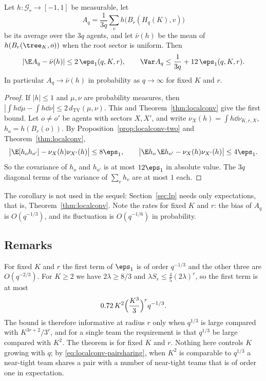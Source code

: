 \begin{corollary}\label{cor:localconv-prob}
Let $h\colon\mathcal G_r\to[-1,1]$ be measurable, let
\[
A_q=\frac1{3q}\sum_vh\bigl(B_r(H_q(K),v)\bigr)
\]
be its average over the $3q$ agents, and let $\bar\nu(h)$ be the mean of
$h(B_r(\tree_K,o))$ when the root sector is uniform. Then
\[
|\E A_q-\bar\nu(h)|\le2\,\eps_1(q,K,r),\qquad\Var A_q\le\frac1{3q}+12\,\eps_1(q,K,r).
\]
In particular $A_q\to\bar\nu(h)$ in probability as $q\to\infty$ for fixed $K$ and $r$.
\end{corollary}

\begin{proof}
If $|h|\le1$ and $\mu,\nu$ are probability measures, then
$|\int h\dd\mu-\int h\dd\nu|\le2\,d_{\mathrm{TV}}(\mu,\nu)$. This and
Theorem~\ref{thm:localconv} give the first bound. Let $o\ne o'$ be agents with sectors
$X,X'$, and write $\nu_X(h)=\int h\dd\nu_{K,r,X}$, $h_o=h(B_r(o))$. By
Proposition~\ref{prop:localconv-two} and Theorem~\ref{thm:localconv},
\[
\bigl|\E[h_oh_{o'}]-\nu_X(h)\nu_{X'}(h)\bigr|\le8\eps_1,\qquad
\bigl|\E h_o\,\E h_{o'}-\nu_X(h)\nu_{X'}(h)\bigr|\le4\eps_1 .
\]
So the covariance of $h_o$ and $h_{o'}$ is at most $12\eps_1$ in absolute value. The $3q$
diagonal terms of the variance of $\sum_vh_v$ are at most $1$ each.
\end{proof}

The corollary is not used in the sequel: Section~\ref{sec:lp} needs only expectations, that
is, Theorem~\ref{thm:localconv}. Note the rates for fixed $K$ and $r$: the bias of $A_q$ is
$O(q^{-1/3})$, and its fluctuation is $O(q^{-1/6})$ in probability.

\subsection{Remarks}\label{sec:localconv-remarks}

\begin{remark}\label{rem:localconv-reading}
For fixed $K$ and $r$ the first term of $\eps_1$ is of order $q^{-1/3}$ and the other three
are $O(q^{-2/3})$. For $K\ge2$ we have $2\lambda\ge8/3$ and $\lambda S_r\le\frac45
(2\lambda)^r$, so the first term is at most
\[
0.72\,K^2\Bigl(\frac{K^3}{3}\Bigr)^{r}q^{-1/3}.
\]
The bound is therefore informative at radius $r$ only when $q^{1/3}$ is large compared with
$K^{3r+2}/3^r$, and for a single team the requirement is that $q^{1/3}$ be large compared
with $K^2$. The theorem is for fixed $K$ and $r$. Nothing here controls $K$ growing with
$q$; by \eqref{eq:localconv-pairsharing}, when $K^2$ is comparable to $q^{1/3}$ a near-tight
team shares a pair with a number of near-tight teams that is of order one in expectation.
\end{remark}


